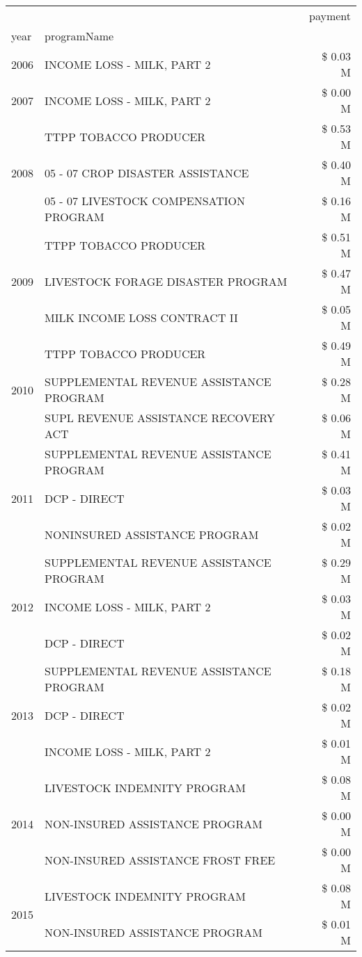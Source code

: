 \begin{tabular}{llr}
\toprule
 &  & payment \\
year & programName &  \\
\midrule
2006 & INCOME LOSS - MILK, PART 2 & \$ 0.03 M \\
\cline{1-3}
2007 & INCOME LOSS - MILK, PART 2 & \$ 0.00 M \\
\cline{1-3}
\multirow[t]{3}{*}{2008} & TTPP TOBACCO PRODUCER & \$ 0.53 M \\
 & 05 - 07 CROP DISASTER ASSISTANCE & \$ 0.40 M \\
 & 05 - 07 LIVESTOCK COMPENSATION PROGRAM & \$ 0.16 M \\
\cline{1-3}
\multirow[t]{3}{*}{2009} & TTPP TOBACCO PRODUCER & \$ 0.51 M \\
 & LIVESTOCK FORAGE DISASTER  PROGRAM & \$ 0.47 M \\
 & MILK INCOME LOSS CONTRACT II & \$ 0.05 M \\
\cline{1-3}
\multirow[t]{3}{*}{2010} & TTPP TOBACCO PRODUCER & \$ 0.49 M \\
 & SUPPLEMENTAL REVENUE ASSISTANCE PROGRAM & \$ 0.28 M \\
 & SUPL REVENUE ASSISTANCE RECOVERY ACT & \$ 0.06 M \\
\cline{1-3}
\multirow[t]{3}{*}{2011} & SUPPLEMENTAL REVENUE ASSISTANCE PROGRAM & \$ 0.41 M \\
 & DCP - DIRECT & \$ 0.03 M \\
 & NONINSURED ASSISTANCE PROGRAM & \$ 0.02 M \\
\cline{1-3}
\multirow[t]{3}{*}{2012} & SUPPLEMENTAL REVENUE ASSISTANCE PROGRAM & \$ 0.29 M \\
 & INCOME LOSS - MILK, PART 2 & \$ 0.03 M \\
 & DCP - DIRECT & \$ 0.02 M \\
\cline{1-3}
\multirow[t]{3}{*}{2013} & SUPPLEMENTAL REVENUE ASSISTANCE PROGRAM & \$ 0.18 M \\
 & DCP - DIRECT & \$ 0.02 M \\
 & INCOME LOSS - MILK, PART 2 & \$ 0.01 M \\
\cline{1-3}
\multirow[t]{3}{*}{2014} & LIVESTOCK INDEMNITY PROGRAM & \$ 0.08 M \\
 & NON-INSURED ASSISTANCE PROGRAM & \$ 0.00 M \\
 & NON-INSURED ASSISTANCE FROST FREE & \$ 0.00 M \\
\cline{1-3}
\multirow[t]{3}{*}{2015} & LIVESTOCK INDEMNITY PROGRAM & \$ 0.08 M \\
 & NON-INSURED ASSISTANCE PROGRAM & \$ 0.01 M \\

\end{tabular}
